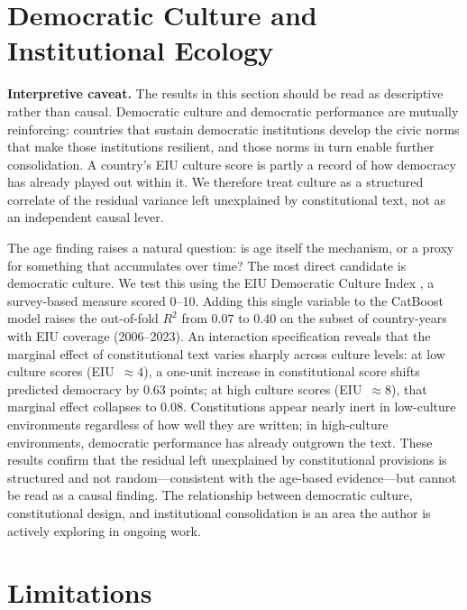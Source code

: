 \documentclass[9pt,twoside]{pnas-new}
\begin{document}
\section*{Democratic Culture and Institutional Ecology}

\textbf{Interpretive caveat.} The results in this section should be read as descriptive rather than causal. Democratic culture and democratic performance are mutually reinforcing: countries that sustain democratic institutions develop the civic norms that make those institutions resilient, and those norms in turn enable further consolidation. A country's EIU culture score is partly a record of how democracy has already played out within it. We therefore treat culture as a structured correlate of the residual variance left unexplained by constitutional text, not as an independent causal lever.

The age finding raises a natural question: is age itself the mechanism, or a proxy for something that accumulates over time? The most direct candidate is democratic culture. We test this using the EIU Democratic Culture Index \cite{eiu_democracy_index}, a survey-based measure scored 0--10. Adding this single variable to the CatBoost model raises the out-of-fold $R^2$ from $0.07$ to $0.40$ on the subset of country-years with EIU coverage (2006--2023). An interaction specification reveals that the marginal effect of constitutional text varies sharply across culture levels: at low culture scores (EIU~$\approx 4$), a one-unit increase in constitutional score shifts predicted democracy by $0.63$ points; at high culture scores (EIU~$\approx 8$), that marginal effect collapses to $0.08$. Constitutions appear nearly inert in low-culture environments regardless of how well they are written; in high-culture environments, democratic performance has already outgrown the text. These results confirm that the residual left unexplained by constitutional provisions is structured and not random---consistent with the age-based evidence---but cannot be read as a causal finding. The relationship between democratic culture, constitutional design, and institutional consolidation is an area the author is actively exploring in ongoing work.

\section*{Limitations}
\end{document}
